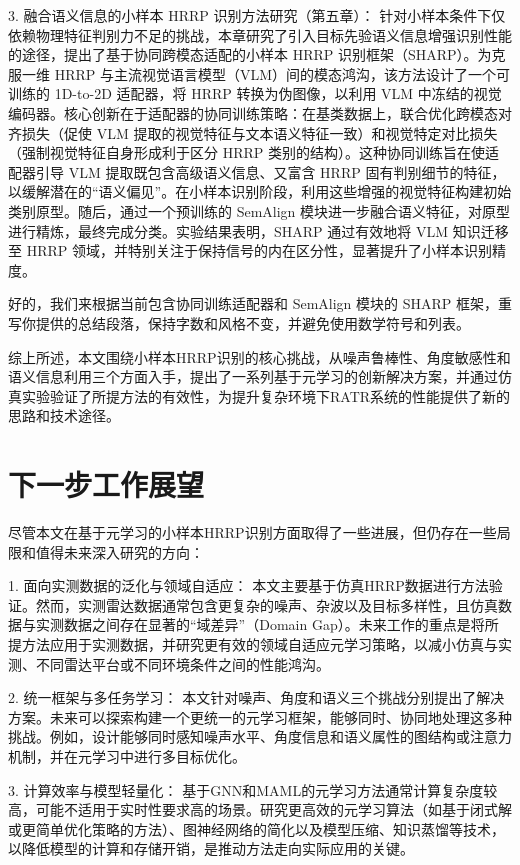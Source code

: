 3. 融合语义信息的小样本 HRRP 识别方法研究（第五章）： 针对小样本条件下仅依赖物理特征判别力不足的挑战，本章研究了引入目标先验语义信息增强识别性能的途径，提出了基于协同跨模态适配的小样本 HRRP 识别框架（SHARP）。为克服一维 HRRP 与主流视觉语言模型（VLM）间的模态鸿沟，该方法设计了一个可训练的 1D-to-2D 适配器，将 HRRP 转换为伪图像，以利用 VLM 中冻结的视觉编码器。核心创新在于适配器的协同训练策略：在基类数据上，联合优化跨模态对齐损失（促使 VLM 提取的视觉特征与文本语义特征一致）和视觉特定对比损失（强制视觉特征自身形成利于区分 HRRP 类别的结构）。这种协同训练旨在使适配器引导 VLM 提取既包含高级语义信息、又富含 HRRP 固有判别细节的特征，以缓解潜在的“语义偏见”。在小样本识别阶段，利用这些增强的视觉特征构建初始类别原型。随后，通过一个预训练的 SemAlign 模块进一步融合语义特征，对原型进行精炼，最终完成分类。实验结果表明，SHARP 通过有效地将 VLM 知识迁移至 HRRP 领域，并特别关注于保持信号的内在区分性，显著提升了小样本识别精度。

好的，我们来根据当前包含协同训练适配器和 SemAlign 模块的 SHARP 框架，重写你提供的总结段落，保持字数和风格不变，并避免使用数学符号和列表。

综上所述，本文围绕小样本HRRP识别的核心挑战，从噪声鲁棒性、角度敏感性和语义信息利用三个方面入手，提出了一系列基于元学习的创新解决方案，并通过仿真实验验证了所提方法的有效性，为提升复杂环境下RATR系统的性能提供了新的思路和技术途径。

\section{下一步工作展望}
\label{sec:outlook}

尽管本文在基于元学习的小样本HRRP识别方面取得了一些进展，但仍存在一些局限和值得未来深入研究的方向：

1.  面向实测数据的泛化与领域自适应： 本文主要基于仿真HRRP数据进行方法验证。然而，实测雷达数据通常包含更复杂的噪声、杂波以及目标多样性，且仿真数据与实测数据之间存在显著的“域差异”（Domain Gap）。未来工作的重点是将所提方法应用于实测数据，并研究更有效的领域自适应元学习策略，以减小仿真与实测、不同雷达平台或不同环境条件之间的性能鸿沟。

2.  统一框架与多任务学习： 本文针对噪声、角度和语义三个挑战分别提出了解决方案。未来可以探索构建一个更统一的元学习框架，能够同时、协同地处理这多种挑战。例如，设计能够同时感知噪声水平、角度信息和语义属性的图结构或注意力机制，并在元学习中进行多目标优化。

3.  计算效率与模型轻量化： 基于GNN和MAML的元学习方法通常计算复杂度较高，可能不适用于实时性要求高的场景。研究更高效的元学习算法（如基于闭式解或更简单优化策略的方法）、图神经网络的简化以及模型压缩、知识蒸馏等技术，以降低模型的计算和存储开销，是推动方法走向实际应用的关键。


